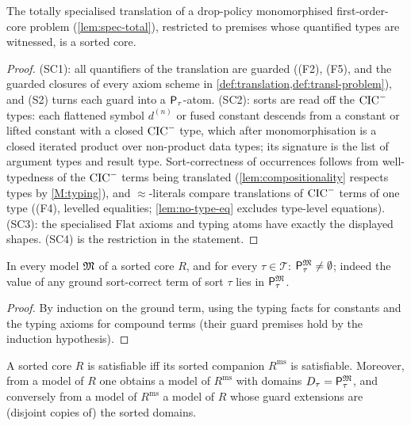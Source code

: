 \begin{lemma}
\label{lem:pipeline-sorted}
The totally specialised translation of a drop-policy monomorphised
first-order-core problem (\cref{lem:spec-total}), restricted to
premises whose quantified types are witnessed, is a sorted core.
\end{lemma}

\begin{proof}
(SC1): all quantifiers of the translation are guarded ((F2), (F5),
and the guarded closures of every axiom scheme in
\cref{def:translation,def:transl-problem}), and (S2) turns each
guard into a $\mathsf{P}_{\tau}$-atom.  (SC2): sorts are read off the
$\mathrm{CIC}^{-}$ types: each flattened symbol $d^{(n)}$ or fused constant
descends from a constant or lifted constant with a closed $\mathrm{CIC}^{-}$
type, which after monomorphisation is a closed iterated product
over non-product data types; its signature is the list of argument
types and result type.  Sort-correctness of occurrences follows
from well-typedness of the $\mathrm{CIC}^{-}$ terms being translated
(\cref{lem:compositionality} respects types by \ref{M:typing}),
and $\approx$-literals compare translations of $\mathrm{CIC}^{-}$ terms of one
type ((F4), levelled equalities; \cref{lem:no-type-eq} excludes
type-level equations).  (SC3): the specialised $\mathrm{Flat}$
axioms and typing atoms have exactly the displayed shapes.  (SC4)
is the restriction in the statement.
\end{proof}

\begin{lemma}
\label{lem:witness}
In every model $\mathfrak{M}$ of a sorted core $R$, and for every $\tau \in
\mathcal{T}$: $\mathsf{P}_{\tau}^{\mathfrak{M}} \neq \emptyset$; indeed the value
of any ground sort-correct term of sort $\tau$ lies in
$\mathsf{P}_{\tau}^{\mathfrak{M}}$.
\end{lemma}

\begin{proof}
By induction on the ground term, using the typing facts for
constants and the typing axioms for compound terms (their guard
premises hold by the induction hypothesis).
\end{proof}

\begin{theorem}[Relativisation]
\label{thm:relativisation}
A sorted core $R$ is satisfiable iff its sorted companion
$R^{\mathrm{ms}}$ is satisfiable.  Moreover, from a model of $R$
one obtains a model of $R^{\mathrm{ms}}$ with domains $D_\tau =
\mathsf{P}_{\tau}^{\mathfrak{M}}$, and conversely from a model of
$R^{\mathrm{ms}}$ a model of $R$ whose guard extensions are
(disjoint copies of) the sorted domains.
\end{theorem}


